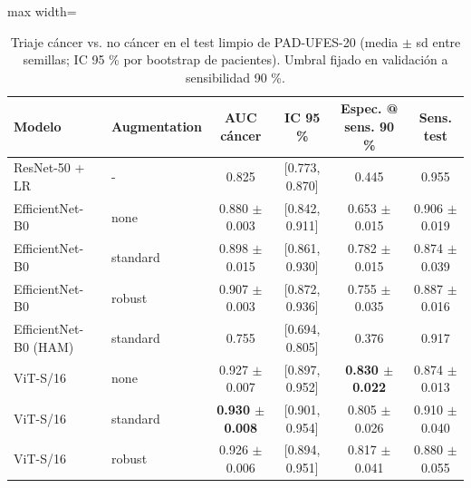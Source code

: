 \begin{table}[t]
\caption{Triaje cáncer vs. no cáncer en el test limpio de PAD-UFES-20 (media $\pm$ sd entre semillas; IC 95 \% por bootstrap de pacientes). Umbral fijado en validación a sensibilidad 90 \%.}
\label{tab:main}
\centering
\begin{adjustbox}{max width=\linewidth}
\begin{tabular}{llcccc}
\toprule
Modelo & Augmentation & AUC cáncer & IC 95 \% & Espec. @ sens. 90 \% & Sens. test \\
\midrule
ResNet-50 + LR & - & 0.825 & [0.773, 0.870] & 0.445 & 0.955 \\
EfficientNet-B0 & none & 0.880 $\pm$ 0.003 & [0.842, 0.911] & 0.653 $\pm$ 0.015 & 0.906 $\pm$ 0.019 \\
EfficientNet-B0 & standard & 0.898 $\pm$ 0.015 & [0.861, 0.930] & 0.782 $\pm$ 0.015 & 0.874 $\pm$ 0.039 \\
EfficientNet-B0 & robust & 0.907 $\pm$ 0.003 & [0.872, 0.936] & 0.755 $\pm$ 0.035 & 0.887 $\pm$ 0.016 \\
EfficientNet-B0 (HAM) & standard & 0.755 & [0.694, 0.805] & 0.376 & 0.917 \\
ViT-S/16 & none & 0.927 $\pm$ 0.007 & [0.897, 0.952] & \textbf{0.830 $\pm$ 0.022} & 0.874 $\pm$ 0.013 \\
ViT-S/16 & standard & \textbf{0.930 $\pm$ 0.008} & [0.901, 0.954] & 0.805 $\pm$ 0.026 & 0.910 $\pm$ 0.040 \\
ViT-S/16 & robust & 0.926 $\pm$ 0.006 & [0.894, 0.951] & 0.817 $\pm$ 0.041 & 0.880 $\pm$ 0.055 \\
\bottomrule
\end{tabular}
\end{adjustbox}
\end{table}
